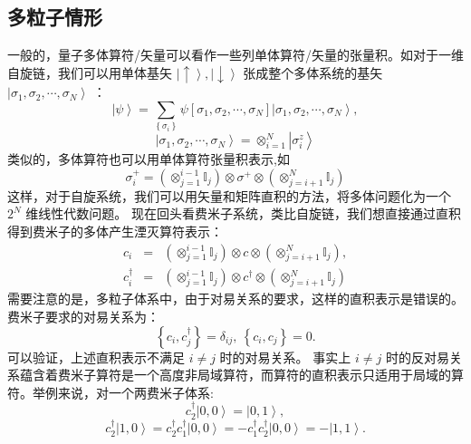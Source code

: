 \documentclass[10pt,UTF8]{ctexart}
\begin{document}
\subsection*{多粒子情形}
\noindent 一般的，量子多体算符/矢量可以看作一些列单体算符/矢量的张量积。如对于一维自旋链，我们可以用单体基矢 $\left|\uparrow\right\rangle ,\left|\downarrow\right\rangle$ 张成整个多体系统的基矢 $\left|\sigma_{1},\sigma_{2},\cdots,\sigma_{N}\right\rangle$ ：
\begin{equation}
	\left|\psi\right\rangle =\sum_{\left\{ \sigma_{i}\right\} }\psi\left[\sigma_{1},\sigma_{2},\cdots,\sigma_{N}\right]\left|\sigma_{1},\sigma_{2},\cdots,\sigma_{N}\right\rangle,
\end{equation}
\begin{equation}
	\left|\sigma_{1},\sigma_{2},\cdots,\sigma_{N}\right\rangle =\otimes_{i=1}^{N}\left|\sigma_{i}^{z}\right\rangle 
\end{equation}
类似的，多体算符也可以用单体算符张量积表示,如
\begin{equation}
	\sigma_{i}^{+}=\left(\otimes_{j=1}^{i-1}\mathbb{I}_{j}\right)\otimes\sigma^{+}\otimes\left(\otimes_{j=i+1}^{N}\mathbb{I}_{j}\right)
\end{equation}
这样，对于自旋系统，我们可以用矢量和矩阵直积的方法，将多体问题化为一个 $2^N$ 维线性代数问题。
现在回头看费米子系统，类比自旋链，我们想直接通过直积得到费米子的多体产生湮灭算符表示：
\begin{eqnarray}
	c_{i}&=&\left(\otimes_{j=1}^{i-1}\mathbb{I}_{j}\right)\otimes c\otimes\left(\otimes_{j=i+1}^{N}\mathbb{I}_{j}\right), \\
	c_{i}^{\dagger}&=&\left(\otimes_{j=1}^{i-1}\mathbb{I}_{j}\right)\otimes c^{\dagger}\otimes\left(\otimes_{j=i+1}^{N}\mathbb{I}_{j}\right) 
\end{eqnarray}
需要注意的是，多粒子体系中，由于对易关系的要求，这样的直积表示是错误的。费米子要求的对易关系为：
\begin{equation}
	\left\{ c_{i},c_{j}^{\dagger}\right\} =\delta_{ij},\ \left\{ c_{i},c_{j}\right\} =0.
\end{equation}
可以验证，上述直积表示不满足 $i \ne j$ 时的对易关系。
事实上 $i \ne j$ 时的反对易关系蕴含着费米子算符是一个高度非局域算符，而算符的直积表示只适用于局域的算符。举例来说，对一个两费米子体系:
\begin{equation}
	c_{2}^{\dagger}\left|0,0\right\rangle =\left|0,1\right\rangle,
\end{equation}
\begin{equation}
	c_{2}^{\dagger}\left|1,0\right\rangle =c_{2}^{\dagger}c_{1}^{\dagger}\left|0,0\right\rangle =-c_{1}^{\dagger}c_{2}^{\dagger}\left|0,0\right\rangle =-\left|1,1\right\rangle.
\end{equation}
\end{document}
